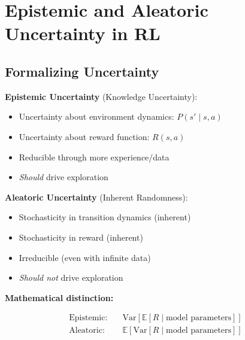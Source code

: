 \section{Epistemic and Aleatoric Uncertainty in RL}

\subsection{Formalizing Uncertainty}

\begin{definition}

\textbf{Epistemic Uncertainty} (Knowledge Uncertainty):
\begin{itemize}
    \item Uncertainty about environment dynamics: $P(s' \mid s, a)$
    \item Uncertainty about reward function: $R(s, a)$
    \item Reducible through more experience/data
    \item \textit{Should} drive exploration
\end{itemize}

\textbf{Aleatoric Uncertainty} (Inherent Randomness):
\begin{itemize}
    \item Stochasticity in transition dynamics (inherent)
    \item Stochasticity in reward (inherent)
    \item Irreducible (even with infinite data)
    \item \textit{Should not} drive exploration
\end{itemize}

\textbf{Mathematical distinction:}

\begin{align}
    \text{Epistemic:} \quad & \text{Var}[\mathbb{E}[R \mid \text{model parameters}]] \\
    \text{Aleatoric:} \quad & \mathbb{E}[\text{Var}[R \mid \text{model parameters}]]
\end{align}
\end{definition}

